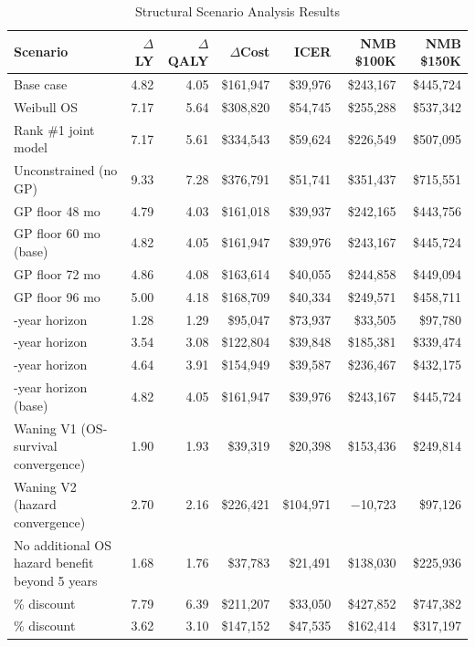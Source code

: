 \documentclass[11pt,a4paper]{article}
\begin{document}
\begin{landscape}
\begin{table}[p]
\centering
\caption{Structural Scenario Analysis Results}
\label{tab:s13}
\footnotesize
\setlength{\tabcolsep}{5pt}
\begin{tabularx}{\linewidth}{@{}>{\raggedright\arraybackslash}Xrrrrrr@{}}
\toprule
\textbf{Scenario} & \textbf{$\Delta$LY} & \textbf{$\Delta$QALY} & \textbf{$\Delta$Cost} & \textbf{ICER} & \textbf{NMB \$100K} & \textbf{NMB \$150K} \\
\midrule
Base case & 4.82 & 4.05 & \$161,947 & \$39,976 & \$243,167 & \$445,724 \\
Weibull OS & 7.17 & 5.64 & \$308,820 & \$54,745 & \$255,288 & \$537,342 \\
Rank \#1 joint model & 7.17 & 5.61 & \$334,543 & \$59,624 & \$226,549 & \$507,095 \\
Unconstrained (no GP) & 9.33 & 7.28 & \$376,791 & \$51,741 & \$351,437 & \$715,551 \\
GP floor 48 mo & 4.79 & 4.03 & \$161,018 & \$39,937 & \$242,165 & \$443,756 \\
GP floor 60 mo (base) & 4.82 & 4.05 & \$161,947 & \$39,976 & \$243,167 & \$445,724 \\
GP floor 72 mo & 4.86 & 4.08 & \$163,614 & \$40,055 & \$244,858 & \$449,094 \\
GP floor 96 mo & 5.00 & 4.18 & \$168,709 & \$40,334 & \$249,571 & \$458,711 \\
10-year horizon & 1.28 & 1.29 & \$95,047 & \$73,937 & \$33,505 & \$97,780 \\
20-year horizon & 3.54 & 3.08 & \$122,804 & \$39,848 & \$185,381 & \$339,474 \\
30-year horizon & 4.64 & 3.91 & \$154,949 & \$39,587 & \$236,467 & \$432,175 \\
40-year horizon (base) & 4.82 & 4.05 & \$161,947 & \$39,976 & \$243,167 & \$445,724 \\
Waning V1 (OS-survival convergence) & 1.90 & 1.93 & \$39,319 & \$20,398 & \$153,436 & \$249,814 \\
Waning V2 (hazard convergence) & 2.70 & 2.16 & \$226,421 & \$104,971 & $-$10,723 & \$97,126 \\
No additional OS hazard benefit beyond 5 years & 1.68 & 1.76 & \$37,783 & \$21,491 & \$138,030 & \$225,936 \\
0\% discount & 7.79 & 6.39 & \$211,207 & \$33,050 & \$427,852 & \$747,382 \\
5\% discount & 3.62 & 3.10 & \$147,152 & \$47,535 & \$162,414 & \$317,197 \\
\bottomrule
\end{tabularx}
\end{table}
\end{landscape}
\end{document}
